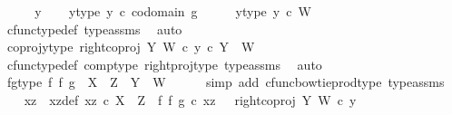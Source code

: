 \begin{isabellebody}
\ \isamarkupfalse%
\isanewline
{}\isamarkupfalse%
\isanewline
\ \ \isamarkupfalse%
\ y\isanewline
\ \ \isamarkupfalse%
\ y{\isacharunderscore}{\kern0pt}type{\isacharcolon}{\kern0pt}\ {\isachardoublequoteopen}y\ {\isasymin}\isactrlsub c\ codomain\ g{\isachardoublequoteclose}\isanewline
\ \ \isamarkupfalse%
\ \isamarkupfalse%
\ y{\isacharunderscore}{\kern0pt}type{}{\isacharcolon}{\kern0pt}\ {\isachardoublequoteopen}y\ {\isasymin}\isactrlsub c\ W{\isachardoublequoteclose}\isanewline
\ \ \ \ \isamarkupfalse%
\ cfunc{\isacharunderscore}{\kern0pt}type{\isacharunderscore}{\kern0pt}def\ type{\isacharunderscore}{\kern0pt}assms{\isacharparenleft}{\kern0pt}{}{\isacharparenright}{\kern0pt}\ \isamarkupfalse%
\ auto\ \isanewline
\ \ \isamarkupfalse%
\ \isamarkupfalse%
\ coproj{\isacharunderscore}{\kern0pt}y{\isacharunderscore}{\kern0pt}type{\isacharcolon}{\kern0pt}\ {\isachardoublequoteopen}{\isacharparenleft}{\kern0pt}right{\isacharunderscore}{\kern0pt}coproj\ Y\ W{\isacharparenright}{\kern0pt}\ {\isasymcirc}\isactrlsub c\ y\ {\isasymin}\isactrlsub c\ {\isacharparenleft}{\kern0pt}Y\ {\isasymCoprod}\ W{\isacharparenright}{\kern0pt}{\isachardoublequoteclose}\ \isanewline
\ \ \ \ \isamarkupfalse%
\ cfunc{\isacharunderscore}{\kern0pt}type{\isacharunderscore}{\kern0pt}def\ comp{\isacharunderscore}{\kern0pt}type\ right{\isacharunderscore}{\kern0pt}proj{\isacharunderscore}{\kern0pt}type\ type{\isacharunderscore}{\kern0pt}assms{\isacharparenleft}{\kern0pt}{}{\isacharparenright}{\kern0pt}\ \isamarkupfalse%
\ auto\isanewline
\ \ \isamarkupfalse%
\ fg{\isacharunderscore}{\kern0pt}type{\isacharcolon}{\kern0pt}\ {\isachardoublequoteopen}{\isacharparenleft}{\kern0pt}f\ {\isasymbowtie}\isactrlsub f\ g{\isacharparenright}{\kern0pt}\ {\isacharcolon}{\kern0pt}\ X\ {\isasymCoprod}\ Z\ {\isasymrightarrow}\ Y\ {\isasymCoprod}\ W{\isachardoublequoteclose}\isanewline
\ \ \ \ \isamarkupfalse%
\ {\isacharparenleft}{\kern0pt}simp\ add{\isacharcolon}{\kern0pt}\ cfunc{\isacharunderscore}{\kern0pt}bowtie{\isacharunderscore}{\kern0pt}prod{\isacharunderscore}{\kern0pt}type\ type{\isacharunderscore}{\kern0pt}assms{\isacharparenright}{\kern0pt}\isanewline
\ \ \isamarkupfalse%
\ xz\ \ xz{\isacharunderscore}{\kern0pt}def{\isacharcolon}{\kern0pt}\ {\isachardoublequoteopen}xz\ {\isasymin}\isactrlsub c\ X\ {\isasymCoprod}\ Z\ {\isasymand}\ {\isacharparenleft}{\kern0pt}f\ {\isasymbowtie}\isactrlsub f\ g{\isacharparenright}{\kern0pt}\ {\isasymcirc}\isactrlsub c\ xz\ {\isacharequal}{\kern0pt}\ \ right{\isacharunderscore}{\kern0pt}coproj\ Y\ W\ {\isasymcirc}\isactrlsub c\ y{\isachardoublequoteclose}\isanewline

\end{isabellebody}
